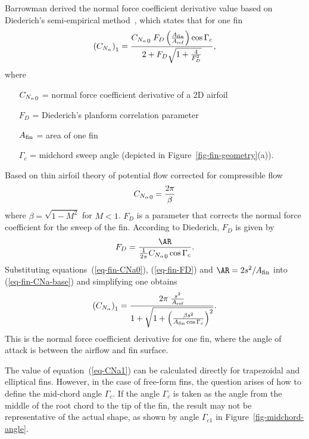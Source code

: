 Barrowman derived the normal force coefficient derivative value based
on Diederich's semi-empirical method~\cite{diederich}, which states that
for one fin
%
\begin{equation}
\del{\CNa}_1 = \frac{\CNa_0\; F_D \left(\frac{\Afin}{\Aref}\right)
                     \cos\Gamma_c}
             {2+F_D\sqrt{1+\frac{4}{F_D^2}}},
\label{eq-fin-CNa-base}
\end{equation}
%
where
%
\begin{itemize}
\item[${C_{N_\alpha}}_0$] = normal force coefficient derivative of a 2D airfoil
\item[$F_D$] = Diederich's planform correlation parameter
\item[$A_{\rm fin}$] = area of one fin
\item[$\Gamma_c$] = midchord sweep angle (depicted in
  Figure~\ref{fig-fin-geometry}(a)).
\end{itemize}
%
Based on thin airfoil theory of potential flow corrected for
compressible flow
%
\begin{equation}
{C_{N_\alpha}}_0 = \frac{2\pi}{\beta}
\label{eq-fin-CNa0}
\end{equation}
%
where $\beta=\sqrt{1-M^2}$ for $M<1$.  $F_D$ is a parameter that
corrects the normal force coefficient for the sweep of the fin.
According to Diederich, $F_D$ is given by
%
\begin{equation}
F_D=\frac{\AR}{\frac{1}{2\pi}\CNa_0\cos\Gamma_c}.
\label{eq-fin-FD}
\end{equation}
%
Substituting equations~(\ref{eq-fin-CNa0}), (\ref{eq-fin-FD}) and 
$\AR=2s^2/\Afin$ into (\ref{eq-fin-CNa-base}) and simplifying one
obtains
%
\begin{equation}
\del{\CNa}_1 = \frac{2\pi\; \frac{s^2}{\Aref}}
             {1+\sqrt{1 + \del{\frac{\beta s^2}{\Afin\cos\Gamma_c}}^2}}.
\label{eq-CNa1}
\end{equation}
%
This is the normal force coefficient derivative for one fin, where the
angle of attack is between the airflow and fin surface.

The value of equation~(\ref{eq-CNa1}) can be calculated directly for
trapezoidal and elliptical fins.  However, in the case of free-form
fins, the question arises of how to define the mid-chord angle
$\Gamma_c$.  If the angle $\Gamma_c$ is taken as the angle from the
middle of the root chord to the tip of the fin, the result may not be
representative of the actual shape, as shown by angle $\Gamma_{c1}$ in
Figure~\ref{fig-midchord-angle}.

